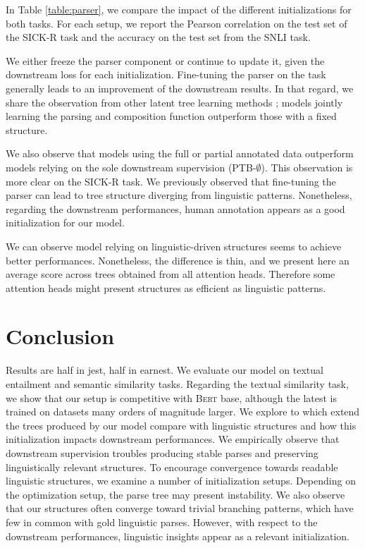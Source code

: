 In Table \ref{table:parser}, we compare the impact of the different initializations for both tasks. For each setup, we report the Pearson correlation on the test set of the SICK-R task and the accuracy on the test set from the SNLI task.

We either freeze the parser component or continue to update it, given the downstream loss for each initialization. Fine-tuning the parser on the task generally leads to an improvement of the downstream results. In that regard, we share the observation from other latent tree learning methods \parencite{maillard_19, choi_18}; models jointly learning the parsing and composition function outperform those with a fixed structure. 

We also observe that models using the full or partial annotated data outperform models relying on the sole downstream supervision (PTB-$\emptyset$). This observation is more clear on the SICK-R task. We previously observed that fine-tuning the parser can lead to tree structure diverging from linguistic patterns. Nonetheless, regarding the downstream performances, human annotation appears as a good initialization for our model. 

We can observe model relying on linguistic-driven structures seems to achieve better performances. Nonetheless, the difference is thin, and we present here an average score across trees obtained from all attention heads. Therefore some attention heads might present structures as efficient as linguistic patterns.

\section{Conclusion}

Results are half in jest, half in earnest. We evaluate our model on textual entailment and semantic similarity tasks. Regarding the textual similarity task, we show that our setup is competitive with \textsc{Bert} base, although the latest is trained on datasets many orders of magnitude larger. We explore to which extend the trees produced by our model compare with linguistic structures and how this initialization impacts downstream performances. We empirically observe that downstream supervision troubles producing stable parses and preserving linguistically relevant structures.  %
To encourage convergence towards readable linguistic structures, we examine a number of initialization setups. Depending on the optimization setup, the parse tree may present instability. We also observe that our structures often converge toward trivial branching patterns, which have few in common with gold linguistic parses. However, with respect to the downstream performances, linguistic insights appear as a relevant initialization.